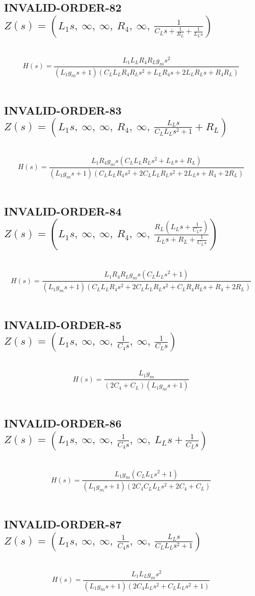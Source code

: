 \documentclass{article}
\begin{document}
\subsection{INVALID-ORDER-82 $Z(s) = \left( L_{1} s, \  \infty, \  \infty, \  R_{4}, \  \infty, \  \frac{1}{C_{L} s + \frac{1}{R_{L}} + \frac{1}{L_{L} s}}\right)$ } \ 
\textbf{\[H(s) = \frac{L_{1} L_{L} R_{4} R_{L} g_{m} s^{2}}{\left(L_{1} g_{m} s + 1\right) \left(C_{L} L_{L} R_{4} R_{L} s^{2} + L_{L} R_{4} s + 2 L_{L} R_{L} s + R_{4} R_{L}\right)}\] } \ 
\subsection{INVALID-ORDER-83 $Z(s) = \left( L_{1} s, \  \infty, \  \infty, \  R_{4}, \  \infty, \  \frac{L_{L} s}{C_{L} L_{L} s^{2} + 1} + R_{L}\right)$ } \ 
\textbf{\[H(s) = \frac{L_{1} R_{4} g_{m} s \left(C_{L} L_{L} R_{L} s^{2} + L_{L} s + R_{L}\right)}{\left(L_{1} g_{m} s + 1\right) \left(C_{L} L_{L} R_{4} s^{2} + 2 C_{L} L_{L} R_{L} s^{2} + 2 L_{L} s + R_{4} + 2 R_{L}\right)}\] } \ 
\subsection{INVALID-ORDER-84 $Z(s) = \left( L_{1} s, \  \infty, \  \infty, \  R_{4}, \  \infty, \  \frac{R_{L} \left(L_{L} s + \frac{1}{C_{L} s}\right)}{L_{L} s + R_{L} + \frac{1}{C_{L} s}}\right)$ } \ 
\textbf{\[H(s) = \frac{L_{1} R_{4} R_{L} g_{m} s \left(C_{L} L_{L} s^{2} + 1\right)}{\left(L_{1} g_{m} s + 1\right) \left(C_{L} L_{L} R_{4} s^{2} + 2 C_{L} L_{L} R_{L} s^{2} + C_{L} R_{4} R_{L} s + R_{4} + 2 R_{L}\right)}\] } \ 
\subsection{INVALID-ORDER-85 $Z(s) = \left( L_{1} s, \  \infty, \  \infty, \  \frac{1}{C_{4} s}, \  \infty, \  \frac{1}{C_{L} s}\right)$ } \ 
\textbf{\[H(s) = \frac{L_{1} g_{m}}{\left(2 C_{4} + C_{L}\right) \left(L_{1} g_{m} s + 1\right)}\] } \ 
\subsection{INVALID-ORDER-86 $Z(s) = \left( L_{1} s, \  \infty, \  \infty, \  \frac{1}{C_{4} s}, \  \infty, \  L_{L} s + \frac{1}{C_{L} s}\right)$ } \ 
\textbf{\[H(s) = \frac{L_{1} g_{m} \left(C_{L} L_{L} s^{2} + 1\right)}{\left(L_{1} g_{m} s + 1\right) \left(2 C_{4} C_{L} L_{L} s^{2} + 2 C_{4} + C_{L}\right)}\] } \ 
\subsection{INVALID-ORDER-87 $Z(s) = \left( L_{1} s, \  \infty, \  \infty, \  \frac{1}{C_{4} s}, \  \infty, \  \frac{L_{L} s}{C_{L} L_{L} s^{2} + 1}\right)$ } \ 
\textbf{\[H(s) = \frac{L_{1} L_{L} g_{m} s^{2}}{\left(L_{1} g_{m} s + 1\right) \left(2 C_{4} L_{L} s^{2} + C_{L} L_{L} s^{2} + 1\right)}\] } \ 
\end{document}
